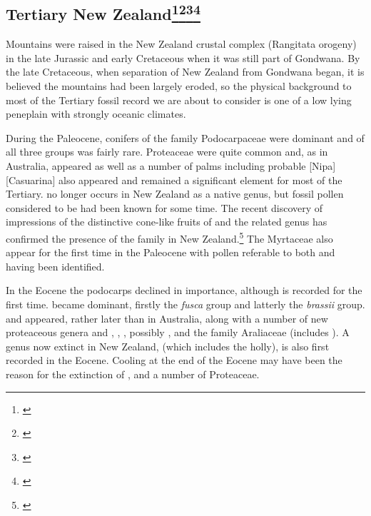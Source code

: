 \subsection[Tertiary New Zealand]{Tertiary New Zealand\thinspace\footnote{\cite{mildenhall1980new}}\footnote{\cite{fleming1979geological}}\footnote{\cite{mildenhall1984palaeobotanical}}\footnote{\cite{pocknall1984late}}}

Mountains were raised in the New Zealand crustal complex (Rangitata orogeny) in the late Jurassic and early Cretaceous when it was still part of Gondwana.
By the late Cretaceous, when separation of New Zealand from Gondwana began, it is believed the mountains had been largely eroded, so the physical background to most of the Tertiary fossil record we are about to consider is one of a low lying peneplain with strongly oceanic climates.

During the Paleocene, conifers of the family Podocarpaceae were dominant and  of all three groups was fairly rare.
Proteaceae were quite common and, as in Australia,  appeared as well as a number of palms including probable [Nipa][Casuarina] also appeared and remained a significant element for most of the Tertiary.
 no longer occurs in New Zealand as a native genus, but fossil pollen considered to be  had been known for some time.
The recent discovery of impressions of the distinctive cone-like fruits of  and the related genus  has confirmed the presence of the family in New Zealand.\footnote{\cite{campbell1985megafossils}}
The Myrtaceae also appear for the first time in the Paleocene with pollen referable to both  and  having been identified.

In the Eocene the podocarps declined in importance, although  is recorded for the first time.
 became dominant, firstly the \emph{fusca} group and latterly the \emph{brassii} group.
 and  appeared, rather later than in Australia, along with a number of new proteaceous genera and , , , possibly , and the family Araliaceae (includes ).
A genus now extinct in New Zealand,  (which includes the holly), is also first recorded in the Eocene.
Cooling at the end of the Eocene may have been the reason for the extinction of ,  and a number of Proteaceae.

